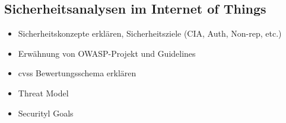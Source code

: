 \subsection{Sicherheitsanalysen im Internet of Things}
\label{sec:sota_sa}
	
	\begin{itemize}
		\item Sicherheitskonzepte erklären, Sicherheitsziele (CIA, Auth, Non-rep, etc.)
		\item Erwähnung von OWASP-Projekt und Guidelines
		\item \gls{cvss} Bewertungsschema erklären
		\item Threat Model
		\item Securityl Goals
	\end{itemize}
